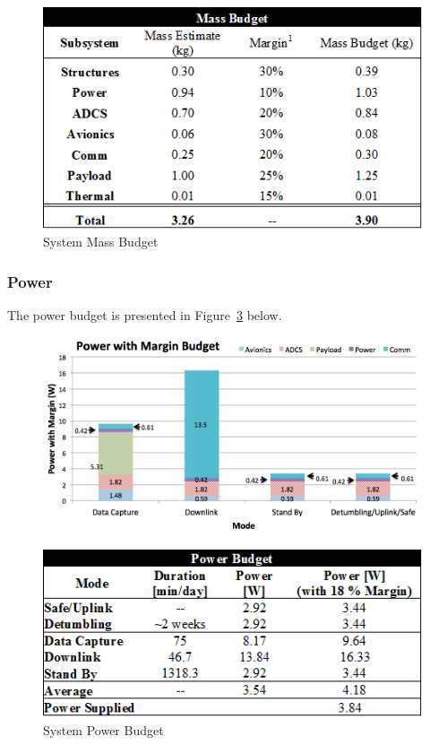 \documentclass[12pt]{article}
\begin{document}
			\begin{figure}[!ht]
				\centering
				\includegraphics[width=5in]{images/MissionOverview_5.png}
				\caption{System Mass Budget}
				\label{fig:Mission_mass2}
			\end{figure}
			
		\subsubsection{Power}
		The power budget is presented in Figure~\ref{fig:Mission_power2} below. 
			\begin{figure}[!ht]
				\centering
				\includegraphics[width=5in]{images/MissionOverview_4.png}
				\label{fig:Mission_power1}
			\end{figure}
			
			\begin{figure}[!ht]
				\centering
				\includegraphics[width=5in]{images/MissionOverview_6.png}
				\caption{System Power Budget}
				\label{fig:Mission_power2}
			\end{figure}
			
\end{document}
